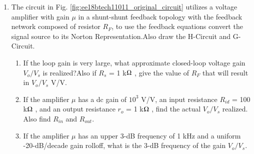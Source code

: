 \begin{enumerate}[label=\thesection.\arabic*.,ref=\thesection.\theenumi]

\item The circuit in Fig. \ref{fig:ee18btech11011_original_circuit} utilizes a voltage amplifier with gain $\mu$ in a shunt-shunt feedback topology with the feedback network composed of resistor $R_F$, to use the feedback equations convert the signal source to its Norton Representation.Also draw the H-Circuit and G-Circuit. 
\begin{enumerate}
\item If the loop gain is very large, what approximate closed-loop voltage gain $V_{o}/V_{s}$ is realized?Also if $R_{s}$ = 1 k$\ohm$ , give the value of $R_{F}$ that will result in $V_{o}/V_{s}$  V/V.

\item If the amplifier $\mu$ has a dc gain of $10^3$ V/V, an input resistance $R_{i d}$ = 100 k$\ohm$ , and an output resistance $r_{o}$ = 1 k$\ohm$ , find the actual $V_{o}/V_{s}$ realized. Also find $R_{i n}$ and $R_{o u t}$.

\item If the amplifier $\mu$ has an upper 3-dB frequency of 1 kHz and a uniform -20-dB/decade gain rolloff, what is the 3-dB frequency of the gain \mid$V_{o}/V_{s}$\mid.
\end{enumerate}
\renewcommand{\thefigure}{\theenumi.\arabic{figure}}
%
\begin{figure}[!ht]
	\begin{center}
		

\end{center}
\end{figure}
\end{enumerate}
